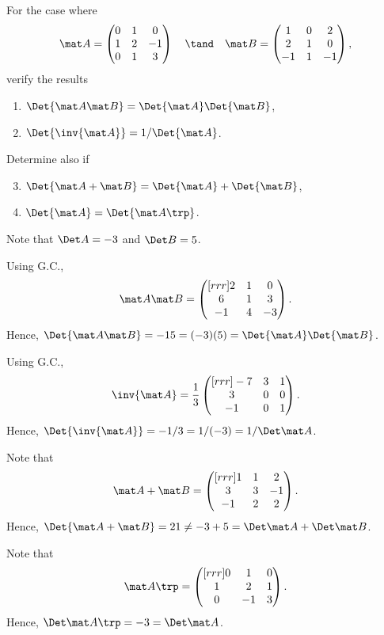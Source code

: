\begin{problem}
    For the case where \[\mat A = \begin{pmatrix} 0 & 1 & 0 \\ 1 & 2 & -1 \\ 0 & 1 & 3 \end{pmatrix} \quad \tand \quad \mat B = \begin{pmatrix} 1 & 0 & 2 \\ 2 & 1 & 0 \\ -1 & 1 & -1 \end{pmatrix},\] verify the results
    \begin{enumerate}
        \item $\Det{\mat A \mat B} = \Det{\mat A} \Det{\mat B}$,
        \item $\Det{\inv{\mat A}} = 1/\Det{\mat A}$.
    \end{enumerate}
    Determine also if
    \begin{enumerate}
        \setcounter{enumi}{2}
        \item $\Det{\mat A + \mat B} = \Det{\mat A} + \Det{\mat B}$,
        \item $\Det{\mat A} = \Det{\mat A\trp}$.
    \end{enumerate}
\end{problem}
\begin{solution}
    Note that $\Det A = -3$ and $\Det B = 5$.
    \begin{ppart}
        Using G.C., \[\mat A \mat B = \begin{pmatrix}[rrr]2 & 1 & 0 \\ 6 & 1 & 3 \\ -1 & 4 & -3\end{pmatrix}.\] Hence, $\Det{\mat A \mat B} = -15 = (-3)(5) = \Det{\mat A} \Det{\mat B}$.
    \end{ppart}
    \begin{ppart}
        Using G.C., \[\inv{\mat A} = \frac13 \begin{pmatrix}[rrr]-7 & 3 & 1 \\ 3 & 0 & 0 \\ -1 & 0 & 1\end{pmatrix}.\] Hence, $\Det{\inv{\mat A}} = -1/3 = 1/(-3) = 1/\Det \mat A$.
    \end{ppart}
    \begin{ppart}
        Note that \[\mat A + \mat B = \begin{pmatrix}[rrr]1 & 1 & 2 \\ 3 & 3 & -1 \\ -1 & 2 & 2\end{pmatrix}.\] Hence, $\Det{\mat A + \mat B} = 21 \neq -3 + 5 = \Det \mat A + \Det \mat B$.
    \end{ppart}
    \begin{ppart}
        Note that \[\mat A \trp = \begin{pmatrix}[rrr] 0 & 1 & 0 \\ 1 & 2 & 1 \\ 0 & -1 & 3\end{pmatrix}.\] Hence, $\Det \mat A\trp = -3 = \Det \mat A$.
    \end{ppart}
\end{solution}

